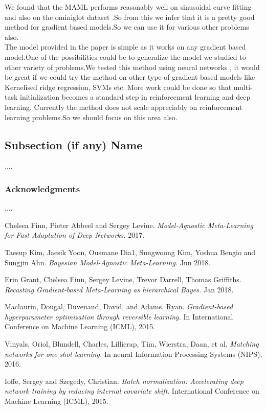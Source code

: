 \documentclass[a4paper]{article}
\begin{document}
We found that the MAML performs reasonably well on sinusoidal curve fitting and also on the ominiglot dataset .So from this we infer that it is a pretty good method for gradient based models.So we can use it for various other problems also.\\
The model provided in the paper is simple as it works on any gradient based model.One of the possibilities could be to generalize the model we studied  to other variety of problems.We tested this method using neural networks , it would be great if we could try the method on other type of gradient based models like Kernelised ridge regression, SVMs etc. More work could be done so that multi-task initialization becomes a standard step in reinforcement learning and deep learning.
Currently the method does not scale appreciably on reinforcement learning problems.So we should focus on this area also.

\subsection*{Subsection (if any) Name}

....

\subsubsection*{Acknowledgments}

....
\pagebreak
\begin{thebibliography}{9}
Chelsea Finn, Pieter Abbeel and Sergey Levine.
\textit{Model-Agnostic Meta-Learning for Fast Adaptation of Deep Networks.}
2017.

Taesup Kim, Jaesik Yoon, Ousmane Dia1, Sungwoong Kim, Yoshua Bengio and Sungjin Ahn.
\textit{Bayesian Model-Agnostic Meta-Learning.}
Jun 2018.

Erin Grant, Chelsea Finn, Sergey Levine, Trevor Darrell, Thomas Griffiths.
\textit{Recasting Gradient-based Meta-Learning as hierarchical Bayes.}
Jan 2018.

Maclaurin, Dougal, Duvenaud, David, and Adams, Ryan.
\textit{Gradient-based hyperparameter optimization through reversible learning.}
In International Conference on Machine Learning (ICML), 2015.

Vinyals, Oriol, Blundell, Charles, Lillicrap, Tim, Wierstra,
Daan, et al. 
\textit{Matching networks for one shot learning.}
In neural Information Processing Systems (NIPS), 2016.


Ioffe, Sergey and Szegedy, Christian. 
\textit{Batch normalization:
Accelerating deep network training by reducing internal
covariate shift}.
International Conference on Machine
Learning (ICML), 2015.


\end{thebibliography}
\end{document}
